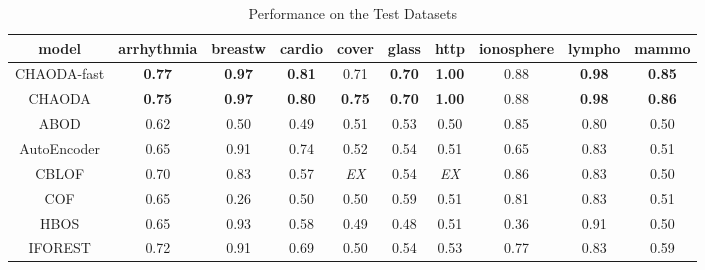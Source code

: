 \begin{table*}[!t]
\renewcommand{\arraystretch}{1.25}
\caption{Performance on the Test Datasets}
\label{table:results:test-performance}
\vskip 0.15in
\begin{center}
\begin{small}
\begin{sc}
\begin{tabular}{|c|c|c|c|c|c|c|c|c|c|}
\hline
\textbf{model} & \textbf{arrhythmia} & \textbf{breastw} & \textbf{cardio} & \textbf{cover} & \textbf{glass} & \textbf{http} & \textbf{ionosphere} & \textbf{lympho} & \textbf{mammo} \\
\hline
        CHAODA-fast &       \textbf{0.77} &    \textbf{0.97} &   \textbf{0.81} &           0.71 &  \textbf{0.70} & \textbf{1.00} &                0.88 &   \textbf{0.98} &  \textbf{0.85} \\
\hline
        CHAODA &       \textbf{0.75} &    \textbf{0.97} &   \textbf{0.80} &  \textbf{0.75} &  \textbf{0.70} & \textbf{1.00} &                0.88 &   \textbf{0.98} &  \textbf{0.86} \\
\hline
                ABOD &                0.62 &             0.50 &            0.49 &           0.51 &           0.53 &          0.50 &                0.85 &            0.80 &           0.50 \\
\hline
        AutoEncoder &                0.65 &             0.91 &            0.74 &           0.52 &           0.54 &          0.51 &                0.65 &            0.83 &           0.51 \\
\hline
                CBLOF &                0.70 &             0.83 &            0.57 &    \textit{EX} &           0.54 &   \textit{EX} &                0.86 &            0.83 &           0.50 \\
\hline
                COF &                0.65 &             0.26 &            0.50 &           0.50 &           0.59 &          0.51 &                0.81 &            0.83 &           0.51 \\
\hline
                HBOS &                0.65 &             0.93 &            0.58 &           0.49 &           0.48 &          0.51 &                0.36 &            0.91 &           0.50 \\
\hline
        IFOREST &                0.72 &             0.91 &            0.69 &           0.50 &           0.54 &          0.53 &                0.77 &            0.83 &           0.59 \\

\end{tabular}
\end{sc}
\end{small}
\end{center}
\end{table*}
